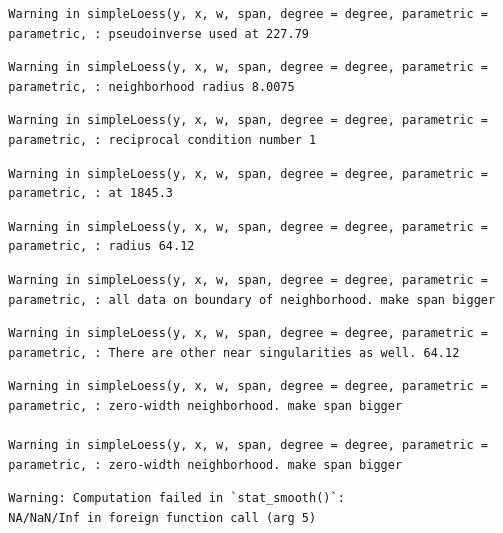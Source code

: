 \documentclass[12pt,twoside]{reedthesis}
\begin{document}
  \begin{verbatim}
  Warning in simpleLoess(y, x, w, span, degree = degree, parametric =
  parametric, : pseudoinverse used at 227.79
  \end{verbatim}
  
  \begin{verbatim}
  Warning in simpleLoess(y, x, w, span, degree = degree, parametric =
  parametric, : neighborhood radius 8.0075
  \end{verbatim}
  
  \begin{verbatim}
  Warning in simpleLoess(y, x, w, span, degree = degree, parametric =
  parametric, : reciprocal condition number 1
  \end{verbatim}
  
  \begin{verbatim}
  Warning in simpleLoess(y, x, w, span, degree = degree, parametric =
  parametric, : at 1845.3
  \end{verbatim}
  
  \begin{verbatim}
  Warning in simpleLoess(y, x, w, span, degree = degree, parametric =
  parametric, : radius 64.12
  \end{verbatim}
  
  \begin{verbatim}
  Warning in simpleLoess(y, x, w, span, degree = degree, parametric =
  parametric, : all data on boundary of neighborhood. make span bigger
  \end{verbatim}
  
  \begin{verbatim}
  Warning in simpleLoess(y, x, w, span, degree = degree, parametric =
  parametric, : There are other near singularities as well. 64.12
  \end{verbatim}
  
  \begin{verbatim}
  Warning in simpleLoess(y, x, w, span, degree = degree, parametric =
  parametric, : zero-width neighborhood. make span bigger
  
  Warning in simpleLoess(y, x, w, span, degree = degree, parametric =
  parametric, : zero-width neighborhood. make span bigger
  \end{verbatim}
  
  \begin{verbatim}
  Warning: Computation failed in `stat_smooth()`:
  NA/NaN/Inf in foreign function call (arg 5)
  \end{verbatim}
  
\end{document}
